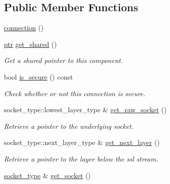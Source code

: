 \subsection*{Public Member Functions}
\begin{DoxyCompactItemize}
\item 
\hyperlink{classwebsocketpp_1_1transport_1_1asio_1_1tls__socket_1_1connection_ab905856e280f2a5d3372d2186539d8b5}{connection} ()
\item 
\hyperlink{classwebsocketpp_1_1transport_1_1asio_1_1tls__socket_1_1connection_a2aa605c27a476eba644e062dc5bc4f6d}{ptr} \hyperlink{classwebsocketpp_1_1transport_1_1asio_1_1tls__socket_1_1connection_ab03c718432a6b2020e8315d137930945}{get\+\_\+shared} ()
\begin{DoxyCompactList}\small\item\em Get a shared pointer to this component. \end{DoxyCompactList}\item 
bool \hyperlink{classwebsocketpp_1_1transport_1_1asio_1_1tls__socket_1_1connection_a4e3311c90f1487bb0739c175a49dac70}{is\+\_\+secure} () const 
\begin{DoxyCompactList}\small\item\em Check whether or not this connection is secure. \end{DoxyCompactList}\item 
socket\+\_\+type\+::lowest\+\_\+layer\+\_\+type \& \hyperlink{classwebsocketpp_1_1transport_1_1asio_1_1tls__socket_1_1connection_af8863f2d811106240b9ef43f6868c918}{get\+\_\+raw\+\_\+socket} ()
\begin{DoxyCompactList}\small\item\em Retrieve a pointer to the underlying socket. \end{DoxyCompactList}\item 
socket\+\_\+type\+::next\+\_\+layer\+\_\+type \& \hyperlink{classwebsocketpp_1_1transport_1_1asio_1_1tls__socket_1_1connection_a5105586ade9ca6e016f308b0aebfcb3c}{get\+\_\+next\+\_\+layer} ()
\begin{DoxyCompactList}\small\item\em Retrieve a pointer to the layer below the ssl stream. \end{DoxyCompactList}\item 
\hyperlink{classwebsocketpp_1_1transport_1_1asio_1_1tls__socket_1_1connection_a99c358b4afc58ee1b1b60cf32fcf5c87}{socket\+\_\+type} \& \hyperlink{classwebsocketpp_1_1transport_1_1asio_1_1tls__socket_1_1connection_af86b843634236dee59431078a23b3527}{get\+\_\+socket} ()

\end{DoxyCompactItemize}
